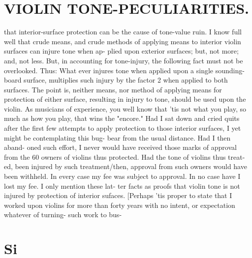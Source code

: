 \documentclass{article}
\begin{document}
\section*{VIOLIN TONE-PECULIARITIES.}
that interior-surface protection can be the cause of tone-value ruin. I know full well that crude means, and crude methods of applying means to interior violin surfaces can injure tone when ap- plied upon exterior surfaces; but, not more; and, not less. But, in accounting for tone-injury, the following fact must not be overlooked. Thus: What ever injures tone when applied upon a single sounding-board surface, multiplies such injury by the factor 2 when applied to both surfaces. The point is, neither means, nor method of applying means for protection of either surface, resulting in injury to tone, should be used upon the violin. As musicians of experience, you well know that 'tis not what you play, so much as how you play, that wins the "encore." Had I sat down and cried quits after the first few attempts to apply protection to those interior surfaces, I yet might be contemplating this bug- bear from the usual distance. Had I then aband- oned such effort, I never would have received those marks of approval from the 60 owners of violins thus protected. Had the tone of violins thus treat- ed, been injured by such treatment/then, approval from such owners would have been withheld. In every case my fee was subject to approval. In no case have I lost my fee. I only mention these lat- ter facts as proofs that violin tone is not injured by protection of interior sufaces. [Perhaps 'tis proper to state that I worked upon violins for more than forty years with no intent, or expectation whatever of turning- such work to bus-

\section*{Si}
\end{document}
